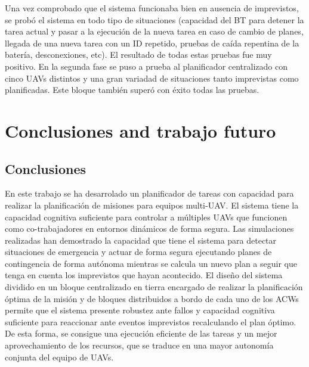 \documentclass[fontsize=11pt, English=false, Español=true, Myfinal=true, twoside, numbers=noenddot]{scrbook}
\begin{document}
Una vez comprobado que el sistema funcionaba bien en ausencia de imprevistos, se probó el sistema en todo tipo de situaciones (capacidad del \gls{BT} para detener la tarea actual y pasar a la ejecución de la nueva tarea en caso de cambio de planes, llegada de una nueva tarea con un \gls{ID} repetido, pruebas de caída repentina de la batería, desconexiones, etc). El resultado de todas estas pruebas fue muy positivo. En la segunda fase se puso a prueba al planificador centralizado con cinco UAVs distintos y una gran variadad de situaciones tanto imprevistas como planificadas. Este bloque también superó con éxito todas las pruebas.

%
% 
\chapter{Conclusiones and trabajo futuro}
\label{ch:ConclusionsAndFutureWork}
\section{Conclusiones}
\label{sec:Conclusions}
En este trabajo se ha desarrolado un planificador de tareas con capacidad para realizar la planificación de misiones para equipos multi-UAV. El sistema tiene la capacidad cognitiva suficiente para controlar a múltiples UAVs que funcionen como co-trabajadores en entornos dinámicos de forma segura. Las simulaciones realizadas han demostrado la capacidad que tiene el sistema para detectar situaciones de emergencia y actuar de forma segura ejecutando planes de contingencia de forma autónoma mientras se calcula un nuevo plan a seguir que tenga en cuenta los imprevistos que hayan acontecido. El diseño del sistema dividido en un bloque centralizado en tierra encargado de realizar la planificación óptima de la misión y de bloques distribuidos a bordo de cada uno de los ACWs permite que el sistema presente robustez ante fallos y capacidad cognitiva suficiente para reaccionar ante eventos imprevistos recalculando el plan óptimo. De esta forma, se consigue una ejecución eficiente de las tareas y un mejor aprovechamiento de los recursos, que se traduce en una mayor autonomía conjunta del equipo de UAVs.
\end{document}
